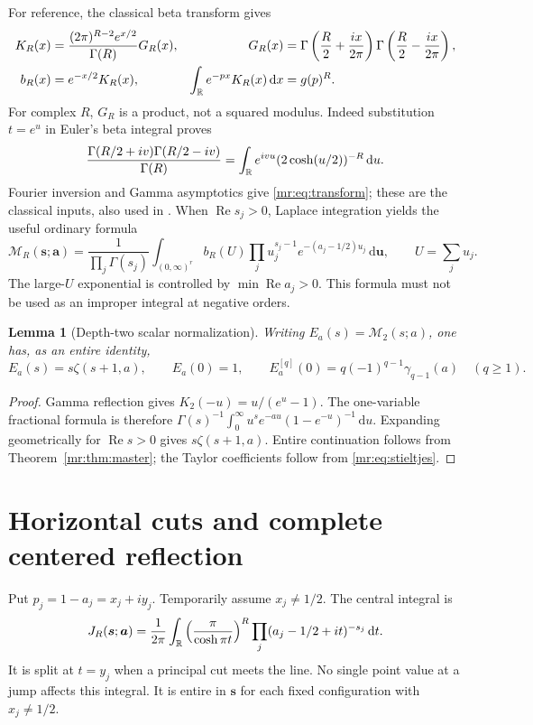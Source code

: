 \documentclass[11pt,letterpaper]{article}
\newtheorem{lemma}[theorem]{Lemma}
\theoremstyle{definition}\newtheorem{definition}[theorem]{Definition}
\theoremstyle{remark}\newtheorem{remark}[theorem]{Remark}
\newcommand{\Rea}{\operatorname{Re}}\newcommand{\Ima}{\operatorname{Im}}
\newcommand{\dd}{\,\mathrm d}\newcommand{\M}{\mathcal M}
\begin{document}
For reference, the classical beta transform gives
\begin{align}
 K_R(x)&=\frac{(2\pi)^{R-2}e^{x/2}}{\Gamma(R)}G_R(x),
 &G_R(x)&=\Gamma\left(\frac R2+\frac{ix}{2\pi}\right)
          \Gamma\left(\frac R2-\frac{ix}{2\pi}\right),\label{mr:eq:kernel}\\
 b_R(x)&=e^{-x/2}K_R(x),
 &\int_\R e^{-px}K_R(x)\dd x&=g(p)^R.\label{mr:eq:transform}
\end{align}
For complex $R$, $G_R$ is a product, not a squared modulus.
Indeed substitution $t=e^u$ in Euler's beta integral proves
\begin{equation}\label{mr:eq:beta}
 \frac{\Gamma(R/2+iv)\Gamma(R/2-iv)}{\Gamma(R)}
 =\int_\R e^{ivu}(2\cosh(u/2))^{-R}\dd u.
\end{equation}
Fourier inversion and Gamma asymptotics give \eqref{mr:eq:transform};
these are the classical inputs, also used in \cite{CDL,CS}.
When $\Rea s_j>0$, Laplace integration yields the useful ordinary formula
\begin{equation}\label{mr:eq:fractional}
 \M_R(\boldsymbol s;\boldsymbol a)=
 \frac1{\prod_j\Gamma(s_j)}\int_{(0,\infty)^r}
 b_R(U)\prod_j u_j^{s_j-1}e^{-(a_j-1/2)u_j}\dd\boldsymbol u,
 \qquad U=\sum_j u_j.
\end{equation}
The large-$U$ exponential is controlled by $\min\Rea a_j>0$.
This formula must not be used as an improper integral at negative orders.

\begin{lemma}[Depth-two scalar normalization]\label{mr:lem:E}
Writing $E_a(s)=\M_2(s;a)$, one has, as an entire identity,
\begin{equation}\label{mr:eq:E}
 E_a(s)=s\zeta(s+1,a),\qquad E_a(0)=1,
 \qquad E_a^{[q]}(0)=q(-1)^{q-1}\gamma_{q-1}(a)\quad(q\ge1).
\end{equation}
\end{lemma}
\begin{proof}
Gamma reflection gives $K_2(-u)=u/(e^u-1)$.
The one-variable fractional formula is therefore
$\Gamma(s)^{-1}\int_0^\infty u^s e^{-au}(1-e^{-u})^{-1}\dd u$.
Expanding geometrically for $\Rea s>0$ gives $s\zeta(s+1,a)$.
Entire continuation follows from Theorem~\ref{mr:thm:master}; the
Taylor coefficients follow from \eqref{mr:eq:stieltjes}.
\end{proof}

\section{Horizontal cuts and complete centered reflection}
\label{mr:sec:cuts}
Put $p_j=1-a_j=x_j+iy_j$. Temporarily assume $x_j\ne1/2$.
The central integral is
\begin{equation}\label{mr:eq:J}
 J_R(\boldsymbol s;\boldsymbol a)=\frac1{2\pi}\int_\R
 \left(\frac\pi{\cosh\pi t}\right)^R
 \prod_j(a_j-1/2+it)^{-s_j}\dd t.
\end{equation}
It is split at $t=y_j$ when a principal cut meets the line. No single
point value at a jump affects this integral. It is entire in
$\boldsymbol s$ for each fixed configuration with $x_j\ne1/2$.
\end{document}
